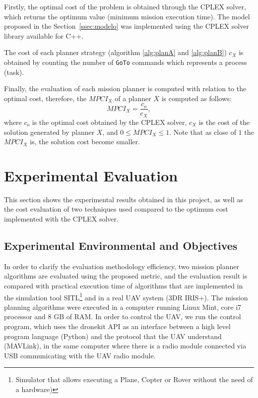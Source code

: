 \documentclass[conference,harvard,brazil,english]{sbatex}
\begin{document}
Firstly, the optimal cost of the problem is obtained through the CPLEX solver, which returns the optimum value (minimum mission execution time). The model proposed in the Section~\ref{ssec:modelo} was implemented using the CPLEX solver library available for C++. 

The cost of each planner strategy (algorithm \ref{alg:planA} and \ref{alg:planB}) $c_X$ is obtained by counting the number of \texttt{GoTo} commands which represents a process (task).

Finally, the evaluation of each mission planner is computed with relation to the optimal cost, therefore, the $MPCI_{X}$ of a planner $X$ is computed as follows:
\begin{equation}
	MPCI_X=\frac{c_o}{c_X},
\end{equation}
where $c_o$ is the optimal cost obtained by the CPLEX solver, \textbf{$c_X$} is the cost of the solution generated by planner $X$, and $0 \leq MPCI_X \leq 1$. Note that as close of $1$ the $MPCI_X$ is, the solution cost become smaller.

\section{Experimental Evaluation}
\label{sec:results}
 This section shows the experimental results obtained in this project, as well as the cost evaluation of two techniques used compared to the optimum cost implemented with the CPLEX solver.
\subsection{Experimental Environmental and Objectives}
\label{ssec:expobjandenv}

In order to clarify the evaluation methodology efficiency, two mission planner algorithms are evaluated using the proposed metric, and the evaluation result is compared with practical execution time of algorithms that are implemented in the simulation tool SITL\footnote{Simulator that allows executing a Plane, Copter or Rover without the need of a hardware)} and in a real UAV system (3DR IRIS+). The mission planning algorithms were executed in a computer running Linux Mint, core i7 processor and 8 GB of RAM. In order to control the UAV, we run the control program, which uses the dronekit API as an interface between a high level program language (Python) and the protocol that the UAV understand (MAVLink), in the same computer where there is a radio module connected via USB communicating with the UAV radio module.
\end{document}
